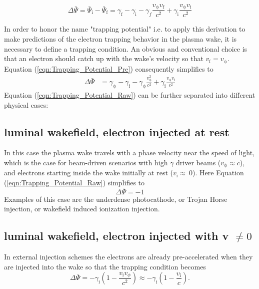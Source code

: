 \begin{equation}
\label{eqn:Trapping_Potential_Pre}
\Delta \bar{\Psi}= \bar{\Psi}_\mathrm{i}-\bar{\Psi}_\mathrm{f}=\gamma_\mathrm{f}-\gamma_\mathrm{i}-\gamma_f\frac{v_\mathrm{\phi}v_\mathrm{f}}{c^2}+\gamma_\mathrm{i}\frac{v_\mathrm{\phi}v_\mathrm{i}}{c^2} 
\end{equation}

In order to honor the name "trapping potential" i.e. to apply this derivation to make predictions of the electron trapping behavior in the plasma wake, it is necessary to define a trapping condition. 
An obvious and conventional choice is that an electron should catch up with the wake's velocity so that 
$v_\mathrm{f}=v_\mathrm{\phi}$.
Equation (\ref{eqn:Trapping_Potential_Pre}) consequently simplifies to 
\begin{align}
\label{eqn:Trapping_Potential_Raw}
\Delta \bar{\Psi}&= \gamma_\mathrm{\phi}-\gamma_\mathrm{i}-\gamma_\mathrm{\phi}\frac{v_\mathrm{\phi}^2}{c^2}+\gamma_\mathrm{i}\frac{v_\mathrm{\phi}v_\mathrm{i}}{c^2} 
\end{align}
Equation (\ref{eqn:Trapping_Potential_Raw}) can be further separated into different physical cases:
\subsection*{luminal wakefield, electron injected  at rest}
In this case the plasma wake travels with a phase velocity near the speed of light, which is the case for beam-driven scenarios with high $\gamma$ driver beams ($v_\mathrm{\phi} \approx c$), and electrons starting inside the wake initially at rest ($v_\mathrm{i} \approx \ 0$).
Here Equation (\ref{eqn:Trapping_Potential_Raw}) simplifies to
\begin{equation}
\label{eqn:Trapping_Potential_TH}
\Delta \bar{\Psi}=-1
\end{equation}
Examples of this case are the underdense photocathode, or Trojan Horse injection\cite{Hidding_PRL_2012}, or wakefield induced ionization injection\cite{MartinezdelaOssa2014231}.

\subsection*{luminal wakefield, electron injected  with v $\neq 0$}
In external injection schemes the electrons are already pre-accelerated when they are injected into the wake so that the trapping condition becomes
\begin{equation}
\Delta \bar{\Psi}= -\gamma_\mathrm{i}(1-\frac{v_\mathrm{i}v_\phi}{c^2})\approx -\gamma_\mathrm{i}(1-\frac{v_\mathrm{i}}{c}).
\end{equation}
